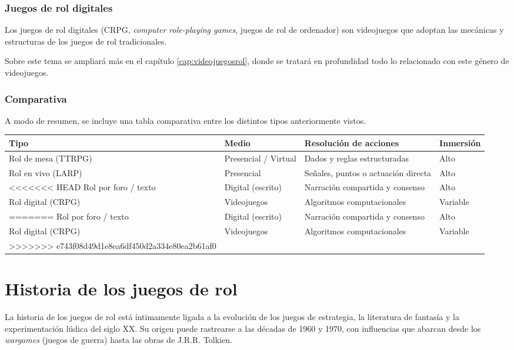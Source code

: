 \subsubsection{Juegos de rol digitales}
Los juegos de rol digitales (CRPG, \textit{computer role-playing games}, juegos de rol de ordenador) son videojuegos que adoptan las mecánicas y estructuras de los juegos de rol tradicionales.

\medskip

Sobre este tema se ampliará más en el capítulo \ref{cap:videojuegosrol}, donde se tratará en profundidad todo lo relacionado con este género de videojuegos.

\subsubsection{Comparativa}
A modo de resumen, se incluye una tabla comparativa entre los distintos tipos anteriormente vistos.
\begin{table}[H]
	\centering
	\begin{tabularx}{\textwidth}{@{} X X X X @{}} 
		\toprule
		\textbf{Tipo} & \textbf{Medio} & \textbf{Resolución de acciones} & \textbf{Inmersión} \\
		\midrule
		Rol de mesa (TTRPG) & Presencial / Virtual & Dados y reglas estructuradas & Alto \\
		Rol en vivo (LARP) & Presencial & Señales, puntos o actuación directa & Alto \\
<<<<<<< HEAD
		Rol por foro / texto & Digital (escrito) & Narración compartida y consenso & Alto \\
		Rol digital (CRPG) & Videojuegos & Algoritmos computacionales & Variable \\
=======
		Rol por foro / texto & Digital (escrito) & Narración compartida y consenso & Alto \\						Rol digital (CRPG) & Videojuegos & Algoritmos computacionales & Variable \\
>>>>>>> e743f08d49d1e8ea6df450d2a334e80ea2b61af0
		\bottomrule
	\end{tabularx}
\end{table}

\section{Historia de los juegos de rol}

La historia de los juegos de rol está íntimamente ligada a la evolución de los juegos de estrategia, la literatura de fantasía y la experimentación lúdica del siglo XX. Su origen puede rastrearse a las décadas de 1960 y 1970, con influencias que abarcan desde los \textit{wargames} (juegos de guerra) hasta las obras de J.R.R. Tolkien.

